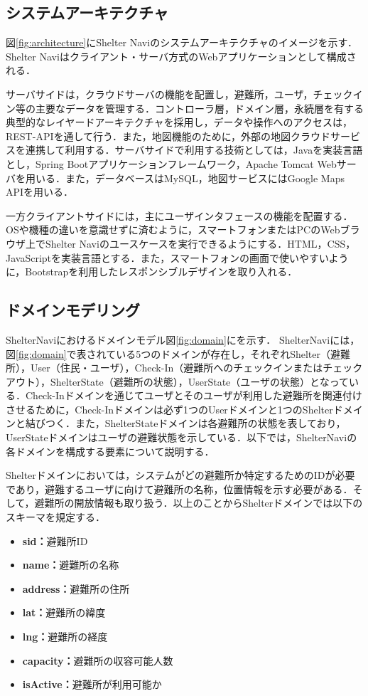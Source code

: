 \documentclass[technicalreport,dvipdfmx]{ieicej}
\begin{document}
\subsection{システムアーキテクチャ}
図\ref{fig:architecture}にShelter Naviのシステムアーキテクチャのイメージを示す．Shelter Naviはクライアント・サーバ方式のWebアプリケーションとして構成される．

サーバサイドは，クラウドサーバの機能を配置し，避難所，ユーザ，チェックイン等の主要なデータを管理する．コントローラ層，ドメイン層，永続層を有する典型的なレイヤードアーキテクチャを採用し，データや操作へのアクセスは，REST-APIを通して行う．また，地図機能のために，外部の地図クラウドサービスを連携して利用する．サーバサイドで利用する技術としては，Javaを実装言語とし，Spring Bootアプリケーションフレームワーク，Apache Tomcat Webサーバを用いる．また，データベースはMySQL，地図サービスにはGoogle Maps APIを用いる．

一方クライアントサイドには，主にユーザインタフェースの機能を配置する．OSや機種の違いを意識せずに済むように，スマートフォンまたはPCのWebブラウザ上でShelter Naviのユースケースを実行できるようにする．HTML，CSS，JavaScriptを実装言語とする．また，スマートフォンの画面で使いやすいように，Bootstrapを利用したレスポンシブルデザインを取り入れる．

\subsection{ドメインモデリング}
ShelterNaviにおけるドメインモデル図\ref{fig:domain}にを示す．
ShelterNaviには，図\ref{fig:domain}で表されている5つのドメインが存在し，それぞれShelter（避難所），User（住民・ユーザ），Check-In（避難所へのチェックインまたはチェックアウト），ShelterState（避難所の状態），UserState（ユーザの状態）となっている．Check-Inドメインを通じてユーザとそのユーザが利用した避難所を関連付けさせるために，Check-Inドメインは必ず1つのUserドメインと1つのShelterドメインと結びつく．また，ShelterStateドメインは各避難所の状態を表しており，UserStateドメインはユーザの避難状態を示している．以下では，ShelterNaviの各ドメインを構成する要素について説明する．

Shelterドメインにおいては，システムがどの避難所か特定するためのIDが必要であり，避難するユーザに向けて避難所の名称，位置情報を示す必要がある．そして，避難所の開放情報も取り扱う．以上のことからShelterドメインでは以下のスキーマを規定する．

\begin{itemize}
    \item{\textbf{sid：}}避難所ID
    \item{\textbf{name：}}避難所の名称
    \item{\textbf{address：}}避難所の住所
    \item{\textbf{lat：}}避難所の緯度
    \item{\textbf{lng：}}避難所の経度
    \item{\textbf{capacity：}}避難所の収容可能人数
    \item{\textbf{isActive：}}避難所が利用可能か
\end{itemize}
\end{document}
